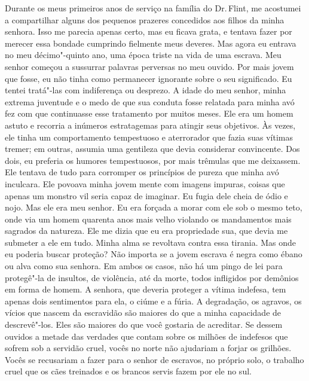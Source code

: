 Durante os meus primeiros anos de
serviço na família do Dr.\,Flint, me acostumei a compartilhar alguns dos
pequenos prazeres concedidos aos filhos da minha senhora. Isso me
parecia apenas certo, mas eu ficava grata, e tentava fazer por merecer
essa bondade cumprindo fielmente meus deveres. Mas agora eu entrava no
meu décimo"-quinto ano, uma época triste na vida de uma escrava. Meu
senhor começou a sussurrar palavras perversas no meu ouvido. Por mais
jovem que fosse, eu não tinha como permanecer ignorante sobre o seu
significado. Eu tentei tratá"-las com indiferença ou desprezo. A idade do
meu senhor, minha extrema juventude e o medo de que sua conduta fosse
relatada para minha avó fez com que continuasse esse tratamento por
muitos meses. Ele era um homem astuto e recorria a inúmeros estratagemas
para atingir seus objetivos. Às vezes, ele tinha um comportamento
tempestuoso e aterrorador que fazia suas vítimas tremer; em outras,
assumia uma gentileza que devia considerar convincente. Dos dois, eu
preferia os humores tempestuosos, por mais trêmulas que me deixassem.
Ele tentava de tudo para corromper os princípios de pureza que minha avó
inculcara. Ele povoava minha jovem mente com imagens impuras, coisas que
apenas um monstro vil seria capaz de imaginar. Eu fugia dele cheia de
ódio e nojo. Mas ele era meu senhor. Eu era forçada a morar com ele sob
o mesmo teto, onde via um homem quarenta anos mais velho violando os
mandamentos mais sagrados da natureza. Ele me dizia que eu era
propriedade sua, que devia me submeter a ele em tudo. Minha alma se
revoltava contra essa tirania. Mas onde eu poderia buscar proteção? Não
importa se a jovem escrava é negra como ébano ou alva como sua senhora.
Em ambos os casos, não há um pingo de lei para protegê"-la de insultos,
de violência, até da morte, todos infligidos por demônios em forma de
homem. A senhora, que deveria proteger a vítima indefesa, tem apenas
dois sentimentos para ela, o ciúme e a fúria. A degradação, os agravos,
os vícios que nascem da escravidão são maiores do que a minha capacidade
de descrevê"-los. Eles são maiores do que você gostaria de acreditar.
Se dessem ouvidos a metade das
verdades que contam sobre os milhões de indefesos que sofrem sob a
servidão cruel, vocês no norte não ajudariam a forjar os grilhões. Vocês
se recusariam a fazer para o senhor de escravos, no próprio solo, o
trabalho cruel que os cães treinados e os brancos servis fazem por ele
no sul.

